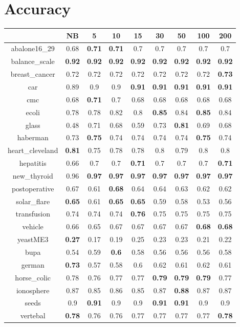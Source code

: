 \documentclass{article}%
\begin{document}
%
\normalsize%
\section*{Accuracy}%
\begin{tabular}{c|cccccccc}%
\hline%
&NB&5&10&15&30&50&100&200\\%
\hline%
abalone16\_29&0.68&\textbf{0.71}&\textbf{0.71}&0.7&0.7&0.7&0.7&0.7\\%
\hline%
balance\_scale&\textbf{0.92}&\textbf{0.92}&\textbf{0.92}&\textbf{0.92}&\textbf{0.92}&\textbf{0.92}&\textbf{0.92}&\textbf{0.92}\\%
\hline%
breast\_cancer&0.72&0.72&0.72&0.72&0.72&0.72&0.72&\textbf{0.73}\\%
\hline%
car&0.89&0.9&0.9&\textbf{0.91}&\textbf{0.91}&\textbf{0.91}&\textbf{0.91}&\textbf{0.91}\\%
\hline%
cmc&0.68&\textbf{0.71}&0.7&0.68&0.68&0.68&0.68&0.68\\%
\hline%
ecoli&0.78&0.78&0.82&0.8&\textbf{0.85}&0.84&\textbf{0.85}&0.84\\%
\hline%
glass&0.48&0.71&0.68&0.59&0.73&\textbf{0.81}&0.69&0.68\\%
\hline%
haberman&0.73&\textbf{0.75}&0.74&0.74&0.74&0.74&\textbf{0.75}&0.74\\%
\hline%
heart\_cleveland&\textbf{0.81}&0.75&0.78&0.78&0.8&0.79&0.8&0.8\\%
\hline%
hepatitis&0.66&0.7&0.7&\textbf{0.71}&0.7&0.7&0.7&\textbf{0.71}\\%
\hline%
new\_thyroid&0.96&\textbf{0.97}&\textbf{0.97}&\textbf{0.97}&\textbf{0.97}&\textbf{0.97}&\textbf{0.97}&\textbf{0.97}\\%
\hline%
postoperative&0.67&0.61&\textbf{0.68}&0.64&0.64&0.63&0.62&0.62\\%
\hline%
solar\_flare&\textbf{0.65}&0.61&\textbf{0.65}&\textbf{0.65}&0.59&0.58&0.53&0.56\\%
\hline%
transfusion&0.74&0.74&0.74&\textbf{0.76}&0.75&0.75&0.75&0.75\\%
\hline%
vehicle&0.66&0.65&0.67&0.67&0.67&0.67&\textbf{0.68}&\textbf{0.68}\\%
\hline%
yeastME3&\textbf{0.27}&0.17&0.19&0.25&0.23&0.23&0.21&0.22\\%
\hline%
bupa&0.54&0.59&\textbf{0.6}&0.58&0.56&0.56&0.56&0.58\\%
\hline%
german&\textbf{0.73}&0.57&0.58&0.6&0.62&0.61&0.62&0.61\\%
\hline%
horse\_colic&0.78&0.76&0.77&0.77&\textbf{0.79}&\textbf{0.79}&\textbf{0.79}&0.77\\%
\hline%
ionosphere&0.87&0.85&0.86&0.85&0.87&\textbf{0.88}&0.87&0.87\\%
\hline%
seeds&0.9&\textbf{0.91}&0.9&0.9&\textbf{0.91}&\textbf{0.91}&0.9&0.9\\%
\hline%
vertebal&\textbf{0.78}&0.76&0.76&0.77&0.77&0.77&0.77&\textbf{0.78}\\%
\hline%
\end{tabular}
\end{document}

